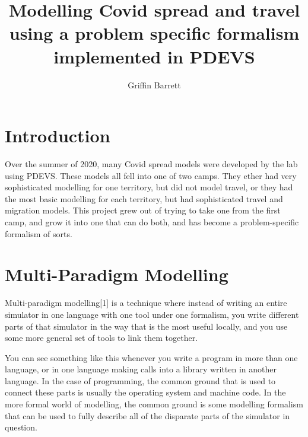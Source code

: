 \documentclass[twocolumn]{article}
\title{Modelling Covid spread and travel using a problem specific formalism implemented in PDEVS}
\author{Griffin Barrett}
\begin{document}
\clearpage
\section{Introduction}

Over the summer of 2020, many Covid spread models were developed by the lab using PDEVS. These models all fell into one of two camps. They ether had very sophisticated modelling for one territory, but did not model travel, or they had the most basic modelling for each territory, but had sophisticated travel and migration models. This project grew out of trying to take one from the first camp, and grow it into one that can do both, and has become a problem-specific formalism of sorts.

\section{Multi-Paradigm Modelling}

\FloatBarrier

Multi-paradigm modelling[1] is a technique where instead of writing an entire simulator in one language with one tool under one formalism, you write different parts of that simulator in the way that is the most useful locally, and you use some more general set of tools to link them together.

You can see something like this whenever you write a program in more than one language, or in one language making calls into a library written in another language. In the case of programming, the common ground that is used to connect these parts is usually the operating system and machine code. In the more formal world of modelling, the common ground is some modelling formalism that can be used to fully describe all of the disparate parts of the simulator in question.
\end{document}
